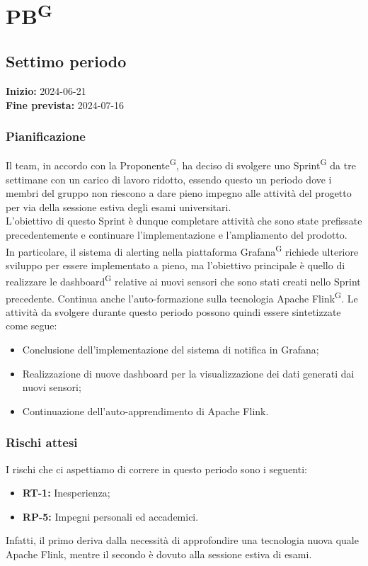 \documentclass[8pt]{article}
\newcommand{\glossterm}[1]{#1\textsuperscript{G}} %
\begin{document}
\newpage
\section{\glossterm{PB}}
\subsection{Settimo periodo}
\textbf{Inizio:} 2024-06-21\\
\textbf{Fine prevista:} 2024-07-16
\subsubsection{Pianificazione}
Il team, in accordo con la \glossterm{Proponente}, ha deciso di svolgere uno \glossterm{Sprint} da tre settimane con un carico di lavoro ridotto, essendo questo un periodo dove i membri del gruppo non riescono a dare pieno impegno alle attività del progetto per via della sessione estiva degli esami universitari. \\
L'obiettivo di questo Sprint è dunque completare attività che sono state prefissate precedentemente e continuare l'implementazione e l'ampliamento del prodotto. \\
In particolare, il sistema di alerting nella piattaforma \glossterm{Grafana} richiede ulteriore sviluppo per essere implementato a pieno, ma l'obiettivo principale è quello di realizzare le \glossterm{dashboard} relative ai nuovi sensori che sono stati creati nello Sprint precedente. Continua anche l'auto-formazione sulla tecnologia Apache \glossterm{Flink}. Le attività da svolgere durante questo periodo possono quindi essere sintetizzate come segue:
\begin{itemize}
    \setlength{\itemsep}{0em}
    \item Conclusione dell'implementazione del sistema di notifica in Grafana;
    \item Realizzazione di nuove dashboard per la visualizzazione dei dati generati dai nuovi sensori;
    \item Continuazione dell'auto-apprendimento di Apache Flink.
\end{itemize}
\subsubsection{Rischi attesi}
I rischi che ci aspettiamo di correre in questo periodo sono i seguenti:
\begin{itemize}
    \item \textbf{RT-1:} Inesperienza;
    \item \textbf{RP-5:} Impegni personali ed accademici.
\end{itemize}
Infatti, il primo deriva dalla necessità di approfondire una tecnologia nuova quale Apache Flink, mentre il secondo è dovuto alla sessione estiva di esami.
\newpage
\end{document}

